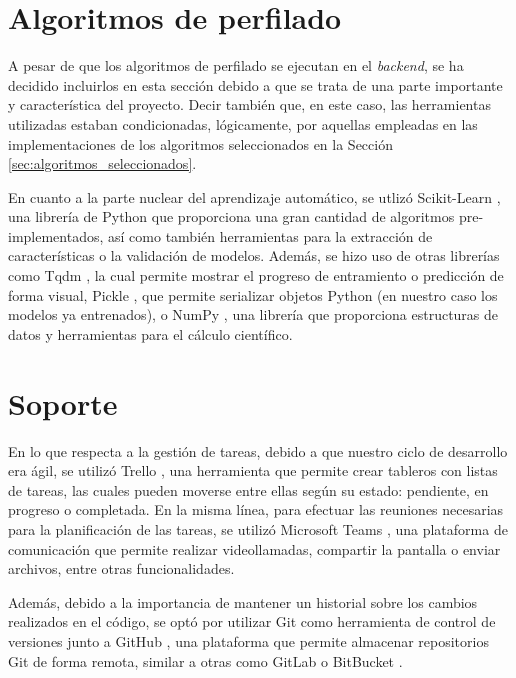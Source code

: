 \section{Algoritmos de perfilado}
\label{sec:herramientas_algoritmos}

A pesar de que los algoritmos de perfilado se ejecutan en el \textit{backend}, se ha decidido incluirlos en esta sección debido a que se trata de una parte
importante y característica del proyecto. Decir también que, en este caso, las herramientas utilizadas estaban condicionadas, lógicamente,
por aquellas empleadas en las implementaciones de los algoritmos seleccionados en la Sección \ref{sec:algoritmos_seleccionados}.

\bigskip
En cuanto a la parte nuclear del aprendizaje automático, se utlizó Scikit-Learn \cite{scikitlearn}, una librería de Python que proporciona una gran cantidad
de algoritmos pre-implementados, así como también herramientas para la extracción de características o la validación de modelos. Además, se hizo uso
de otras librerías como Tqdm \cite{tqdm}, la cual permite mostrar el progreso de entramiento o predicción de forma visual, Pickle \cite{pickle}, que permite
serializar objetos Python (en nuestro caso los modelos ya entrenados), o NumPy \cite{numpy}, una librería que proporciona estructuras de datos y herramientas para el cálculo científico.

\section{Soporte}
\label{sec:herramientas_soporte}

En lo que respecta a la gestión de tareas, debido a que nuestro ciclo de desarrollo era ágil, se utilizó Trello \cite{trello}, una herramienta que permite crear tableros con listas de tareas, las cuales pueden moverse
entre ellas según su estado: pendiente, en progreso o completada. En la misma línea, para efectuar las reuniones necesarias para la planificación de las tareas, se utilizó Microsoft Teams \cite{teams}, una plataforma
de comunicación que permite realizar videollamadas, compartir la pantalla o enviar archivos, entre otras funcionalidades.

\bigskip
Además, debido a la importancia de mantener un historial sobre los cambios realizados en el código, se optó por utilizar Git \cite{git} como herramienta de control de versiones junto a GitHub \cite{github}, una plataforma que permite
almacenar repositorios Git de forma remota, similar a otras como GitLab \cite{gitlab} o BitBucket \cite{bitbucket}.

